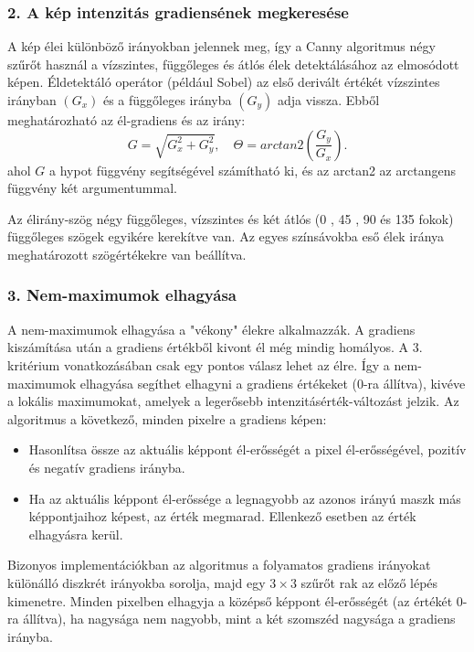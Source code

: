 \subsubsection{2. A kép intenzitás gradiensének megkeresése}

A kép élei különböző irányokban jelennek meg, így a Canny algoritmus négy szűrőt használ a vízszintes, függőleges és átlós élek detektálásához az elmosódott képen. Éldetektáló operátor (például Sobel) az első derivált értékét vízszintes irányban $(G_x)$ és a függőleges irányba $(G_y)$ adja vissza. Ebből meghatározható az él-gradiens és az irány:
$$
G = \sqrt{G_{x}^{2}+G_{y}^{2}},
\quad
\Theta = arctan2\left(\frac{G_y}{G_x}\right).
$$
ahol $G$ a hypot függvény segítségével számítható ki, és az arctan2 az arctangens függvény két argumentummal.

Az élirány-szög négy függőleges, vízszintes és két átlós (0 , 45 , 90  és 135 fokok) függőleges szögek egyikére kerekítve van. Az egyes színsávokba eső élek iránya meghatározott szögértékekre van beállítva.

\subsubsection{3. Nem-maximumok elhagyása}

A nem-maximumok elhagyása a "vékony" élekre alkalmazzák. A gradiens kiszámítása után a gradiens értékből kivont él még mindig homályos. A 3. kritérium vonatkozásában csak egy pontos válasz lehet az élre. Így a nem-maximumok elhagyása segíthet elhagyni a gradiens értékeket (0-ra állítva), kivéve a lokális maximumokat, amelyek a legerősebb intenzitásérték-változást jelzik. Az algoritmus a következő, minden pixelre a gradiens képen:
\begin{itemize}
\item Hasonlítsa össze az aktuális képpont él-erősségét a pixel él-erősségével, pozitív és negatív gradiens irányba.
\item Ha az aktuális képpont él-erőssége a legnagyobb az azonos irányú maszk más képpontjaihoz képest, az érték megmarad. Ellenkező esetben az érték elhagyásra kerül.
\end{itemize}

Bizonyos implementációkban az algoritmus a folyamatos gradiens irányokat különálló diszkrét irányokba sorolja, majd egy $3 \times 3$ szűrőt rak az előző lépés kimenetre. Minden pixelben elhagyja a középső képpont él-erősségét (az értékét 0-ra állítva), ha nagysága nem nagyobb, mint a két szomszéd nagysága a gradiens irányba.

